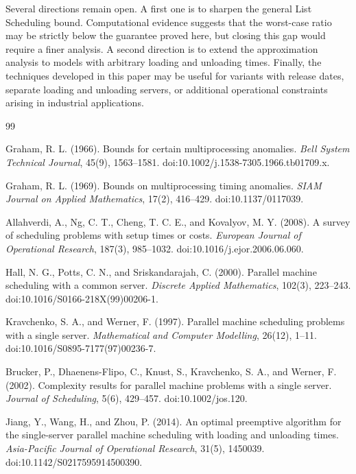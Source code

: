 \documentclass[11pt]{article}
\begin{document}
Several directions remain open. A first one is to sharpen the general List
Scheduling bound. Computational evidence suggests that the worst-case ratio may
be strictly below the guarantee proved here, but closing this gap would require
a finer analysis. A second
direction is to extend the approximation analysis to models with arbitrary
loading and unloading times. Finally, the techniques developed in this paper may be useful for variants with
release dates, separate loading and unloading servers, or additional operational
constraints arising in industrial applications.

\begin{thebibliography}{99}


Graham, R. L. (1966).
Bounds for certain multiprocessing anomalies.
\emph{Bell System Technical Journal}, 45(9), 1563--1581.
doi:10.1002/j.1538-7305.1966.tb01709.x.

Graham, R. L. (1969).
Bounds on multiprocessing timing anomalies.
\emph{SIAM Journal on Applied Mathematics}, 17(2), 416--429.
doi:10.1137/0117039.

Allahverdi, A., Ng, C. T., Cheng, T. C. E., and Kovalyov, M. Y. (2008).
A survey of scheduling problems with setup times or costs.
\emph{European Journal of Operational Research}, 187(3), 985--1032.
doi:10.1016/j.ejor.2006.06.060.

Hall, N. G., Potts, C. N., and Sriskandarajah, C. (2000).
Parallel machine scheduling with a common server.
\emph{Discrete Applied Mathematics}, 102(3), 223--243.
doi:10.1016/S0166-218X(99)00206-1.

Kravchenko, S. A., and Werner, F. (1997).
Parallel machine scheduling problems with a single server.
\emph{Mathematical and Computer Modelling}, 26(12), 1--11.
doi:10.1016/S0895-7177(97)00236-7.

Brucker, P., Dhaenens-Flipo, C., Knust, S., Kravchenko, S. A., and Werner, F. (2002).
Complexity results for parallel machine problems with a single server.
\emph{Journal of Scheduling}, 5(6), 429--457.
doi:10.1002/jos.120.

Jiang, Y., Wang, H., and Zhou, P. (2014).
An optimal preemptive algorithm for the single-server parallel machine scheduling with loading and unloading times.
\emph{Asia-Pacific Journal of Operational Research}, 31(5), 1450039.
doi:10.1142/S0217595914500390.


\end{thebibliography}
\end{document}
